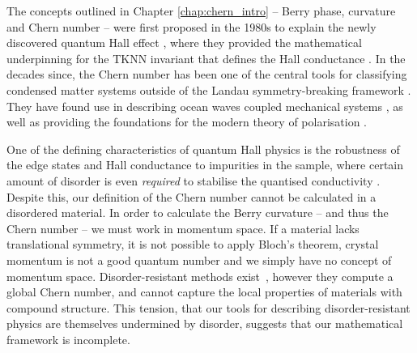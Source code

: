 

The concepts outlined in Chapter \ref{chap:chern_intro} -- Berry phase, curvature and Chern number -- were first proposed in the 1980s to explain the newly discovered quantum Hall effect \cite{klitzing_new_1980, laughlin_quantized_1981}, where they provided the mathematical underpinning for the TKNN invariant that defines the Hall conductance \cite{thouless_quantized_1982,berry_quantal_1984}. In the decades since, the Chern number has been one of the central tools for classifying condensed matter systems outside of the Landau symmetry-breaking framework \cite{haldane_model_1988, hasan_topological_2010,qi_topological_2011,chiu_classification_2016}. They have found use in describing ocean waves \cite{deplace_topological_2017} coupled mechanical systems \cite{nash_topological_2015,xiao_geometric_2015, mitchell_amorphous_2018}, as well as providing the foundations for the modern theory of polarisation \cite{resta_macroscopic_1999,vanderbilt_electric_1993, vanderbilt_berry_2018}. 

One of the defining characteristics of quantum Hall physics is the robustness of the edge states and Hall conductance to impurities in the sample, where certain amount of disorder is even \textit{required} to stabilise the quantised conductivity \cite{trugman_localization_1983,chalker_percolation_1988}. Despite this, our definition of the Chern number cannot be calculated in a disordered material. In order to calculate the Berry curvature -- and thus the Chern number -- we must work in momentum space. If a material lacks translational symmetry, it is not possible to apply Bloch's theorem, crystal momentum is not a good quantum number and we simply have no concept of momentum space. Disorder-resistant methods exist~\cite{niu_quantized_1985, bellissard_noncommutative_1994}, however they compute a global Chern number, and cannot capture the local properties of materials with compound structure. This tension, that our tools for describing disorder-resistant physics are themselves undermined by disorder, suggests that our mathematical framework is incomplete. 
 
